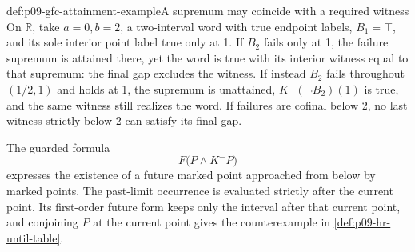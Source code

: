 \begin{hbexample}{def:p09-gfc-attainment-example}{A supremum may coincide with a required witness}
On \(\mathbb R\), take \(a=0,b=2\), a two-interval
word with true endpoint labels, \(B_1=\top\),
and its sole interior point label true only at 1.
If \(B_2\) fails only at 1, the failure supremum
is attained there, yet the word is true with its
interior witness equal to that supremum: the final
gap excludes the witness.
If instead \(B_2\) fails throughout \((1/2,1)\)
and holds at 1, the supremum is unattained,
\(K^-(\neg B_2)(1)\) is true, and the same
witness still realizes the word.
If failures are cofinal below 2, no last witness
strictly below 2 can satisfy its final gap.

The guarded formula
\[
          F\bigl(P\land K^-P\bigr)
\]
expresses the existence of a future marked point
approached from below by marked points. The
past-limit occurrence is evaluated strictly after
the current point. Its first-order future form
keeps only the interval after that current point,
and conjoining \(P\) at the current point gives
the counterexample in
\cref{def:p09-hr-until-table}.
\end{hbexample}

